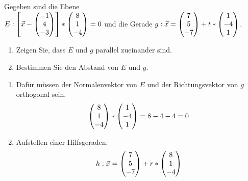 Gegeben sind die Ebene \\$E: \left[ \vec x -  \begin{pmatrix} -1 \\ 4\\ -3 \end{pmatrix}\right]*\begin{pmatrix} 8\\ 1 \\-4 \end{pmatrix}=0$ und die Gerade $g: \vec x=\begin{pmatrix} 7\\5\\-7 \end{pmatrix}+t*\begin{pmatrix} 1\\-4\\1 \end{pmatrix}$.
\begin{enumerate}
	\item Zeigen Sie, dass $E$ und $g$ parallel zueinander sind.
	\item Bestimmen Sie den Abstand von $E$ und $g$.
\end{enumerate}

\begin{lsg}{}
	\begin{enumerate}
		\item Dafür müssen der Normalenvektor von $E$ und der Richtungsvektor von $g$ orthogonal sein.
		\begin{equation*}
			\begin{pmatrix} 8\\ 1 \\-4 \end{pmatrix}*\begin{pmatrix} 1\\-4\\1 \end{pmatrix}=8-4-4=0
		\end{equation*}
		\item Aufstellen einer Hilfsgeraden:
		\begin{align*}
			h: \vec x=\begin{pmatrix} 7\\5\\-7 \end{pmatrix}+r*\begin{pmatrix} 8\\ 1 \\-4 \end{pmatrix}
		\end{align*}
	\end{enumerate}
\end{lsg}





